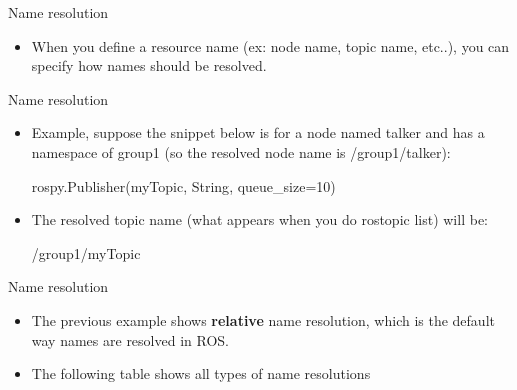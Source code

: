 \documentclass{beamer}
\begin{document}
\begin{frame}{Name resolution}
\begin{itemize}
    \item When you define a resource name (ex: node name, topic name, etc..), you can specify how names should be resolved.
    

\end{itemize}

\end{frame}

\begin{frame}{Name resolution}
    \begin{itemize}
        
        \item Example, suppose the snippet below is for a node named {\ttfamily \colorbox{gray!30!white}{talker}} and has a namespace of {\ttfamily \colorbox{gray!30!white}{group1}} (so the resolved node name is {\ttfamily \colorbox{gray!30!white}{/group1/talker}}):
        
        \begin{focus}
            \centering
            \fontsize{9}{1} \ttfamily rospy.Publisher({\color{blue}myTopic}, {\color{blue}String}, {\color{blue}queue\_size=10})
        \end{focus}
        
        \item The resolved topic name  (what appears when you do {\ttfamily \colorbox{gray!30!white}{rostopic list}}) will be:
        
        \begin{focus}
            \centering
            \fontsize{9}{1} \ttfamily /group1/myTopic
        \end{focus}
        
    \end{itemize}
    
\end{frame}


\begin{frame}{Name resolution}
    \begin{itemize}
        
        \item The previous example shows \textbf{relative} name resolution, which is the default way names are resolved in ROS.
        
        \item The following table shows all types of name resolutions
    \end{itemize}
\end{frame}
\end{document}
